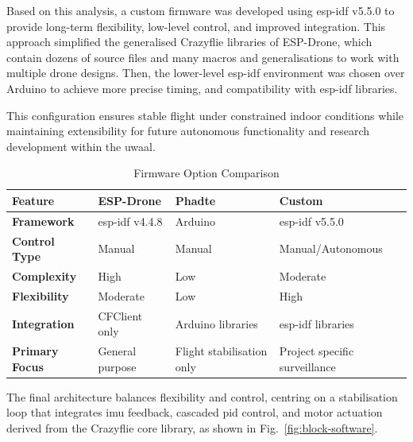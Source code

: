 Based on this analysis, a custom firmware was developed using \gls{esp-idf} v5.5.0 to provide long-term flexibility, low-level control, and improved integration. This approach simplified the generalised Crazyflie libraries of ESP-Drone, which contain dozens of source files and many macros and generalisations to work with multiple drone designs. Then, the lower-level \gls{esp-idf} environment was chosen over Arduino to achieve more precise timing, and compatibility with \gls{esp-idf} libraries.

This configuration ensures stable flight under constrained indoor conditions while maintaining extensibility for future autonomous functionality and research development within the \gls{uwaal}.

\begin{table}[H]
\centering
\renewcommand{\arraystretch}{1.2}
\caption{Firmware Option Comparison}
\begin{tabular}{|>{\bfseries}p{}|p{}|p{}|p{}|}
\hline
\rowcolor{gray!15}
\textbf{Feature} & \textbf{ESP-Drone} & \textbf{Phadte} & \textbf{Custom} \\
\hline
Framework & \gls{esp-idf} v4.4.8 & Arduino & \gls{esp-idf} v5.5.0 \\
\hline
Control Type & Manual & Manual & Manual/Autonomous \\
\hline
Complexity & High & Low & Moderate \\
\hline
Flexibility & Moderate & Low & High \\
\hline
Integration & CFClient only & Arduino libraries & \gls{esp-idf} libraries \\
\hline
Primary Focus & General purpose & Flight stabilisation only & Project specific surveillance \\
\hline
\end{tabular}
\end{table}

The final architecture balances flexibility and control, centring on a stabilisation loop that integrates \gls{imu} feedback, cascaded \gls{pid} control, and motor actuation derived from the Crazyflie core library, as shown in Fig.~\ref{fig:block-software}.

